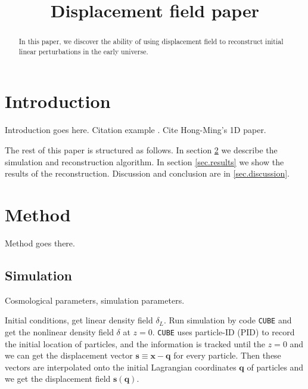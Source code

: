 \documentclass[aps,prd,twocolumn,superscriptaddress,amsfont,amssymb,amsmath,nofootinbib,showpacs,balancelastpage]{revtex4-1}
\newcommand{\bs}{\boldsymbol}
\begin{document}
\addtolength{\hoffset}{-0.525cm}
\addtolength{\textwidth}{1.05cm}
\title{Displacement field paper}




\begin{abstract}
In this paper, we discover the ability of using displacement field to reconstruct initial linear perturbations in the early universe.
\end{abstract}


\maketitle

\section{Introduction}\label{sec.intro}
Introduction goes here. Citation example \cite{2013MNRAS.436..540H}.
Cite Hong-Ming's 1D paper.

The rest of this paper is structured as follows. In section \ref{sec.method} we describe the simulation and reconstruction algorithm. In section \ref{sec.results} we show the results of the reconstruction. Discussion and conclusion are in \ref{sec.discussion}.



\section{Method}\label{sec.method}
Method goes there.

\subsection{Simulation}
Cosmological parameters, simulation parameters.

Initial conditions, get linear density field $\delta_L$. Run simulation by code {\tt CUBE} and get the nonlinear density field $\delta$ at $z=0$. {\tt CUBE} uses particle-ID (PID) to record the initial location of particles, and the information is tracked until the $z=0$ and we can get the displacement vector ${\bs s}\equiv{\bs x}-{\bs q}$ for every particle. Then these vectors are interpolated onto the initial Lagrangian coordinates ${\bs q}$ of particles and we get the displacement field ${\bs s}({\bs q})$.
\end{document}
